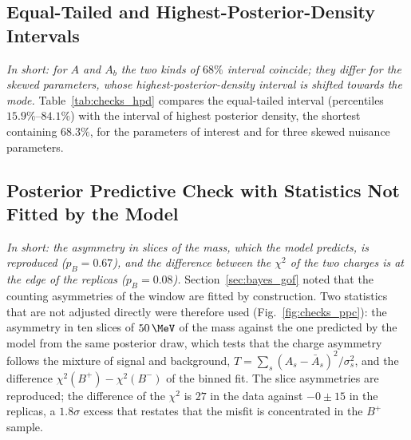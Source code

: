 \subsection{Equal-Tailed and Highest-Posterior-Density Intervals}
\label{sec:checks_hpd}
\emph{In short: for $A$ and $A_b$ the two kinds of $68\%$ interval coincide; they differ for the skewed parameters, whose highest-posterior-density interval is shifted towards the mode.}
Table~\ref{tab:checks_hpd} compares the equal-tailed interval (percentiles $15.9\%$--$84.1\%$) with the interval of highest posterior density, the shortest containing $68.3\%$, for the parameters of interest and for three skewed nuisance parameters.

\begin{table}[h]
\centering
{}
\caption{Equal-tailed and highest-posterior-density $68\%$ intervals and skewness of the marginal posteriors.}
\label{tab:checks_hpd}
\end{table}

\subsection{Posterior Predictive Check with Statistics Not Fitted by the Model}
\label{sec:checks_ppc}
\emph{In short: the asymmetry in slices of the mass, which the model predicts, is reproduced ($p_B=0.67$), and the difference between the $\chi^2$ of the two charges is at the edge of the replicas ($p_B=0.08$).}
Section~\ref{sec:bayes_gof} noted that the counting asymmetries of the window are fitted by construction. Two statistics that are not adjusted directly were therefore used (Fig.~\ref{fig:checks_ppc}): the asymmetry in ten slices of $50\,\MeV$ of the mass against the one predicted by the model from the same posterior draw, which tests that the charge asymmetry follows the mixture of signal and background, $T=\sum_s(A_s-\bar A_s)^2/\sigma_s^2$, and the difference $\chi^2(B^+)-\chi^2(B^-)$ of the binned fit. The slice asymmetries are reproduced; the difference of the $\chi^2$ is $27$ in the data against $-0\pm15$ in the replicas, a $1.8\sigma$ excess that restates that the misfit is concentrated in the $B^+$ sample.

